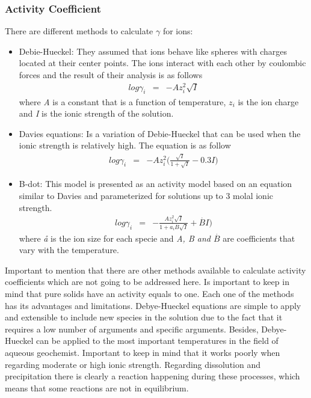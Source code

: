 \documentclass[ppgc,mestrado,english]{iiufrgs}
\begin{document}
\subsubsection{Activity Coefficient} 
There are different methods to calculate $\gamma$ for ions:
\begin{itemize}
\item Debie-Hueckel: They assumed that ions behave like spheres with charges located at their center points. The ions interact with each other by coulombic forces and the result of their analysis is as follows
\begin{eqnarray} \label{eq:debyeEq}
log \gamma_i &=& - Az_i^2\sqrt{I}
\end{eqnarray} 
where \emph{A} is a constant that is a function of temperature, \emph{$z_i$} is the ion charge and \emph{I} is the ionic strength of the solution.
\item Davies equations: Is a variation of Debie-Hueckel that can be used when the ionic strength is relatively high. The equation is as follow
\begin{eqnarray} \label{eq:daviesEq}
log \gamma_i &=& - Az_i^2 \bigg(\frac{\sqrt{I}}{1+\sqrt{I}} - 0.3 I)
\end{eqnarray}
\item B-dot: This model is presented as an activity model based on an equation similar to Davies and parameterized for solutions up to 3 molal ionic strength.
\begin{eqnarray} \label{eq:bdotEq}
log \gamma_i &=& - \frac{Az_i^2 \sqrt{I}}{1+ a_i B \sqrt{I}} + \overset{.}{B} I )
\end{eqnarray}
where \emph{\aa}  is the ion size for each specie and \emph{A, B and $\overset{.}{B}$} are coefficients that vary with the temperature.
\end{itemize}
Important to mention that there are other methods available to calculate activity coefficients which are not going to be addressed here. Is important to keep in mind that pure solids have an activity equals to one.
Each one of the methods has its advantages and limitations. Debye-Hueckel equations are simple to apply and extensible to include new species in the solution due to the fact that it requires a low number of arguments and specific arguments. Besides, Debye-Hueckel can be applied to the most important temperatures in the field of aqueous geochemist. Important to keep in mind that it works poorly when regarding moderate or high ionic strength.
Regarding dissolution and precipitation there is clearly a reaction happening during these processes, which means that some reactions are not in equilibrium. 
\end{document}
